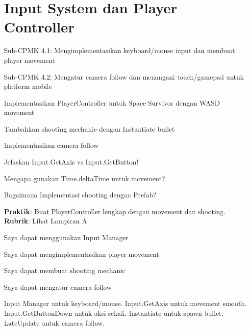 \documentclass[../main]{subfiles}
\begin{document}
\chapter{Input System dan Player Controller}

\begin{subcpmk}
  \item Sub-CPMK 4.1: Mengimplementasikan keyboard/mouse input dan membuat player movement
  \item Sub-CPMK 4.2: Mengatur camera follow dan menangani touch/gamepad untuk platform mobile
\end{subcpmk}




\begin{aktivitas}
  \item Implementasikan PlayerController untuk Space Survivor dengan WASD movement
  \item Tambahkan shooting mechanic dengan Instantiate bullet
  \item Implementasikan camera follow
\end{aktivitas}

\begin{latihan}
  \item Jelaskan Input.GetAxis vs Input.GetButton!
  \item Mengapa gunakan Time.deltaTime untuk movement?
  \item Bagaimana Implementasi shooting dengan Prefab?
\end{latihan}

\begin{asesmen}
\textbf{Praktik}: Buat PlayerController lengkap dengan movement dan shooting.
\textbf{Rubrik}: Lihat Lampiran A
\end{asesmen}

\begin{checklist}
  \item Saya dapat menggunakan Input Manager
  \item Saya dapat mengimplementasikan player movement
  \item Saya dapat membuat shooting mechanic
  \item Saya dapat mengatur camera follow
\end{checklist}

\begin{rangkuman}
Input Manager untuk keyboard/mouse. Input.GetAxis untuk movement smooth. Input.GetButtonDown untuk aksi sekali. Instantiate untuk spawn bullet. LateUpdate untuk camera follow.
\end{rangkuman}

\ifSubfilesClassLoaded{
  \renewcommand{\bibname}{Daftar Pustaka}
  
  
}{}
\end{document}
